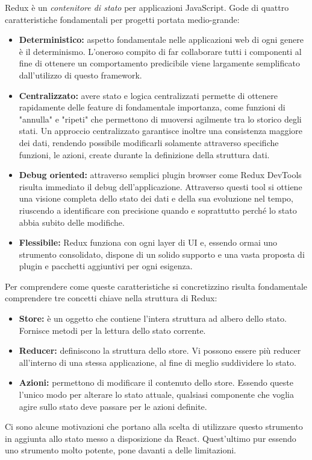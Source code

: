 Redux \cite{caratteristiche_redux} è un \emph{contenitore di stato} per applicazioni JavaScript. Gode di quattro caratteristiche fondamentali per progetti portata medio-grande:
\begin{itemize}
  \item \textbf{Deterministico:} aspetto fondamentale nelle applicazioni web di ogni genere è il determinismo. L'oneroso compito di far collaborare tutti i componenti al fine di ottenere un comportamento predicibile viene largamente semplificato dall'utilizzo di questo framework.
  \item \textbf{Centralizzato:} avere stato e logica centralizzati permette di ottenere rapidamente delle feature di fondamentale importanza, come funzioni di "annulla" e "ripeti" che permettono di muoversi agilmente tra lo storico degli stati. Un approccio centralizzato garantisce inoltre una consistenza maggiore dei dati, rendendo possibile modificarli solamente attraverso specifiche funzioni, le azioni, create durante la definizione della struttura dati.
  \item \textbf{Debug oriented:} attraverso semplici plugin browser come Redux DevTools risulta immediato il debug dell'applicazione. Attraverso questi tool si ottiene una visione completa dello stato dei dati e della sua evoluzione nel tempo, riuscendo a identificare con precisione quando e soprattutto perché lo stato abbia subito delle modifiche.
  \item \textbf{Flessibile:} Redux funziona con ogni layer di UI e, essendo ormai uno strumento consolidato, dispone di un solido supporto e una vasta proposta di plugin e pacchetti aggiuntivi per ogni esigenza.
\end{itemize}
Per comprendere come queste caratteristiche si concretizzino risulta fondamentale comprendere tre concetti chiave nella struttura di Redux:
\begin{itemize}
  \item \textbf{Store:} è un oggetto che contiene l'intera struttura ad albero dello stato.\cite{store_redux} Fornisce metodi per la lettura dello stato corrente.
  \item \textbf{Reducer:} definiscono la struttura dello store.\cite{reducer_redux} Vi possono essere più reducer all'interno di una stessa applicazione, al fine di meglio suddividere lo stato.
  \item \textbf{Azioni:} permettono di modificare il contenuto dello store.\cite{azioni_redux} Essendo queste l'unico modo per alterare lo stato attuale, qualsiasi componente che voglia agire sullo stato deve passare per le azioni definite.
\end{itemize}
Ci sono alcune motivazioni che portano alla scelta di utilizzare questo strumento in aggiunta allo stato messo a disposizione da React. Quest'ultimo pur essendo uno strumento molto potente, pone davanti a delle limitazioni.

